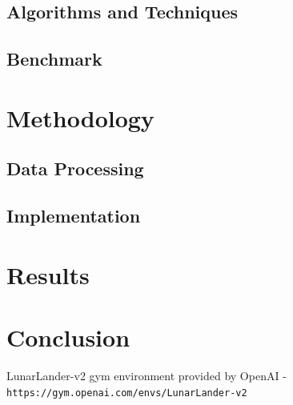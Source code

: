 \documentclass{svproc}
\begin{document}
\subsection*{Algorithms and Techniques}
\subsection*{Benchmark}
\section{Methodology}
\subsection*{Data Processing}
\subsection*{Implementation}
\section{Results}
\section{Conclusion}
\begin{thebibliography}{}
LunarLander-v2 gym environment provided by OpenAI - \texttt{https://gym.openai.com/envs/LunarLander-v2}
\end{thebibliography}
\end{document}
